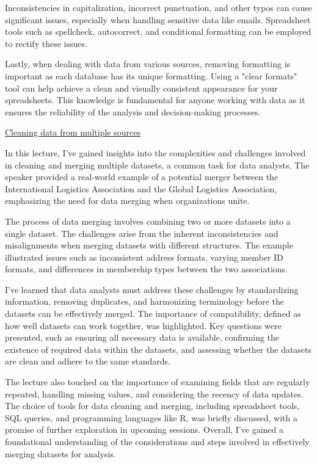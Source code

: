 \documentclass[]{article}
\begin{document}
Inconsistencies in capitalization, incorrect punctuation, and other typos can cause significant issues, especially when handling sensitive data like emails. Spreadsheet tools such as spellcheck, autocorrect, and conditional formatting can be employed to rectify these issues.

Lastly, when dealing with data from various sources, removing formatting is important as each database has its unique formatting. Using a "clear formats" tool can help achieve a clean and visually consistent appearance for your spreadsheets. This knowledge is fundamental for anyone working with data as it ensures the reliability of the analysis and decision-making processes.

\uline{Cleaning data from multiple sources}

In this lecture, I've gained insights into the complexities and challenges involved in cleaning and merging multiple datasets, a common task for data analysts. The speaker provided a real-world example of a potential merger between the International Logistics Association and the Global Logistics Association, emphasizing the need for data merging when organizations unite.

The process of data merging involves combining two or more datasets into a single dataset. The challenges arise from the inherent inconsistencies and misalignments when merging datasets with different structures. The example illustrated issues such as inconsistent address formats, varying member ID formats, and differences in membership types between the two associations.

I've learned that data analysts must address these challenges by standardizing information, removing duplicates, and harmonizing terminology before the datasets can be effectively merged. The importance of compatibility, defined as how well datasets can work together, was highlighted. Key questions were presented, such as ensuring all necessary data is available, confirming the existence of required data within the datasets, and assessing whether the datasets are clean and adhere to the same standards.

The lecture also touched on the importance of examining fields that are regularly repeated, handling missing values, and considering the recency of data updates. The choice of tools for data cleaning and merging, including spreadsheet tools, SQL queries, and programming languages like R, was briefly discussed, with a promise of further exploration in upcoming sessions. Overall, I've gained a foundational understanding of the considerations and steps involved in effectively merging datasets for analysis.
\end{document}
